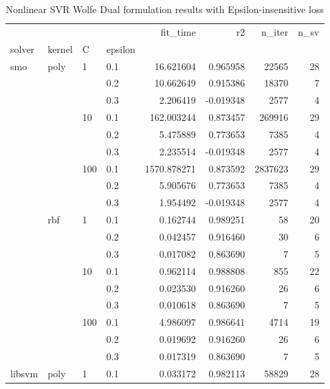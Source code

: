 \begin{table}[H]
\centering
\caption{Nonlinear SVR Wolfe Dual formulation results with Epsilon-insensitive loss}
\label{nonlinear_dual_svr_cv_results}
\begin{tabular}{llllrrrr}
\toprule
       &     &     &     &     fit\_time &        r2 &    n\_iter &  n\_sv \\
solver & kernel & C & epsilon &              &           &           &       \\
\midrule
smo & poly & 1   & 0.1 &    16.621604 &  0.965958 &     22565 &    28 \\
       &     &     & 0.2 &    10.662649 &  0.915386 &     18370 &     7 \\
       &     &     & 0.3 &     2.206419 & -0.019348 &      2577 &     4 \\
       &     & 10  & 0.1 &   162.003244 &  0.873457 &    269916 &    29 \\
       &     &     & 0.2 &     5.475889 &  0.773653 &      7385 &     4 \\
       &     &     & 0.3 &     2.235514 & -0.019348 &      2577 &     4 \\
       &     & 100 & 0.1 &  1570.878271 &  0.873592 &   2837623 &    29 \\
       &     &     & 0.2 &     5.905676 &  0.773653 &      7385 &     4 \\
       &     &     & 0.3 &     1.954492 & -0.019348 &      2577 &     4 \\
       & rbf & 1   & 0.1 &     0.162744 &  0.989251 &        58 &    20 \\
       &     &     & 0.2 &     0.042457 &  0.916460 &        30 &     6 \\
       &     &     & 0.3 &     0.017082 &  0.863690 &         7 &     5 \\
       &     & 10  & 0.1 &     0.962114 &  0.988808 &       855 &    22 \\
       &     &     & 0.2 &     0.023530 &  0.916260 &        26 &     6 \\
       &     &     & 0.3 &     0.010618 &  0.863690 &         7 &     5 \\
       &     & 100 & 0.1 &     4.986097 &  0.986641 &      4714 &    19 \\
       &     &     & 0.2 &     0.019692 &  0.916260 &        26 &     6 \\
       &     &     & 0.3 &     0.017319 &  0.863690 &         7 &     5 \\
libsvm & poly & 1   & 0.1 &     0.033172 &  0.982113 &     58829 &    28 \\

\end{tabular}
\end{table}
